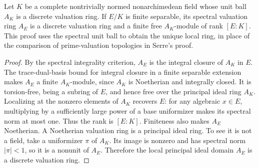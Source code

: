 \begin{lemma}
\label{fw:finite-valuation-ring}
\leanok
Let $K$ be a complete nontrivially normed nonarchimedean field whose
unit ball $A_K$ is a discrete valuation ring. If $E/K$ is finite
separable, its spectral valuation ring $A_E$ is a discrete valuation
ring and a finite free $A_K$-module of rank $[E:K]$.
This proof uses the spectral unit ball to obtain the unique local ring,
in place of the comparison of prime-valuation topologies in Serre's proof.
\end{lemma}
\begin{proof}
By the spectral integrality criterion, $A_E$ is the integral closure
of $A_K$ in $E$. The trace-dual-basis bound for integral closure in a
finite separable extension makes $A_E$ a finite $A_K$-module, since
$A_K$ is Noetherian and integrally closed. It is torsion-free, being
a subring of $E$, and hence free over the principal ideal ring $A_K$.
Localizing at the nonzero elements of $A_K$ recovers $E$: for any
algebraic $x\in E$, multiplying by a sufficiently large power of a
base uniformizer makes its spectral norm at most one. Thus the rank
is $[E:K]$.
Finiteness also makes $A_E$ Noetherian. A Noetherian valuation ring is
a principal ideal ring. To see it is not a field, take a uniformizer
$\pi$ of $A_K$. Its image is nonzero and has spectral norm
$|\pi|<1$, so it is a nonunit of $A_E$. Therefore the local principal
ideal domain $A_E$ is a discrete valuation ring.
\end{proof}

